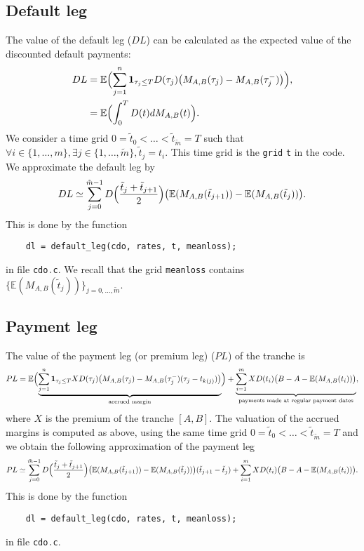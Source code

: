 \documentclass[10pt, a4paper]{article}
\newcommand{\code}[1]{{\upshape \lstinline[language=c]{#1}}}
\newcommand{\E}{\mathbb{E}}
\begin{document}
\subsection{Default leg}
The value of the default leg ($DL$) can be calculated as the expected value of the discounted default payments: 
\begin{align*}
    DL & = \E \Bigl( \sum_{j=1}^n \mathbf{1}_{\tau_j \le T} D(\tau_j) \bigl(M_{A,B}(\tau_j) - M_{A,B}(\tau_j^-) \bigr) \Bigr),\\
    &= \E \Bigl( \int_0^T D(t) d M_{A,B}(t) \Bigr). 
\end{align*}
We consider a time grid $0 = \tilde{t}_0 < \dots < \tilde{t}_{\tilde{m}} = T$ such that $\forall i \in \{1,\dots,m\}, \exists j \in \{1,\dots,\tilde{m}\}, \tilde{t}_j = t_i$. This time grid is the \code{grid} \code{t} in the code. We approximate the default leg by 
\begin{equation*}
    DL \simeq \sum_{j=0}^{\tilde{m}-1} D\Bigl( \frac{\tilde{t}_j + \tilde{t}_{j+1}}{2} \Bigr) \bigl(\E(M_{A,B}(\tilde{t}_{j+1})) - \E(M_{A,B}(\tilde{t}_j))\bigr).
\end{equation*}
This is done by the function
\begin{lstlisting}
    dl = default_leg(cdo, rates, t, meanloss);
\end{lstlisting}
in file \code{cdo.c}. We recall that the grid \code{meanloss} contains $\{\E(M_{A,B}(\tilde{t}_j))\}_{j=0,\dots,\tilde{m}}$.

\subsection{Payment leg}
The value of the payment leg (or premium leg) ($PL$) of the tranche is 
\begin{equation*}
    PL = \E \Bigl( \underbrace{\sum_{j=1}^n \mathbf{1}_{\tau_j \le T} X D(\tau_j) \bigl(M_{A,B}(\tau_j) - M_{A,B}(\tau_j^-) (\tau_j - t_{k(j)})\bigr)}_{\text{accrued margin}} \Bigr) + \underbrace{\sum_{i=1}^m X D(t_i) \bigl(B-A-\E(M_{A,B}(t_i))\bigr)}_{\text{payments made at regular payment dates}},
\end{equation*}
where $X$ is the premium of the tranche $[A,B]$.
The valuation of the accrued margins is computed as above, using the same time grid $0 = \tilde{t}_0 < \dots < \tilde{t}_{\tilde{m}} = T$ and we obtain the following approximation of the payment leg  
\begin{equation*}
    PL \simeq \sum_{j=0}^{\tilde{m}-1} D\Bigl( \frac{\tilde{t}_j + \tilde{t}_{j+1}}{2} \Bigr) \bigl(\E(M_{A,B}(\tilde{t}_{j+1})) - \E(M_{A,B}(\tilde{t}_j))\bigr) (\tilde{t}_{j+1} - \tilde{t}_j) + \sum_{i=1}^m X D(t_i) \bigl(B-A-\E(M_{A,B}(t_i))\bigr).
\end{equation*}
This is done by the function
\begin{lstlisting}
    dl = default_leg(cdo, rates, t, meanloss);
\end{lstlisting}
in file \code{cdo.c}. 
\end{document}
